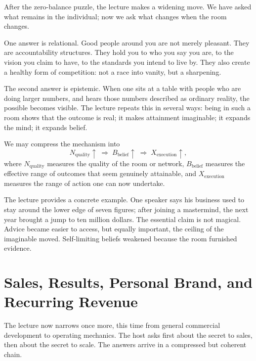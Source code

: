 After the zero-balance puzzle, the lecture makes a widening move. We have asked what remains in the individual; now we ask what changes when the room changes.

One answer is relational. Good people around you are not merely pleasant. They are accountability structures. They hold you to who you say you are, to the vision you claim to have, to the standards you intend to live by. They also create a healthy form of competition: not a race into vanity, but a sharpening.

The second answer is epistemic. When one sits at a table with people who are doing larger numbers, and hears those numbers described as ordinary reality, the possible becomes visible. The lecture repeats this in several ways: being in such a room shows that the outcome is real; it makes attainment imaginable; it expands the mind; it expands belief.

We may compress the mechanism into
\begin{equation}
N_{\mathrm{quality}} \uparrow
\;\Longrightarrow\;
B_{\mathrm{belief}} \uparrow
\;\Longrightarrow\;
X_{\mathrm{execution}} \uparrow,
\end{equation}
where \(N_{\mathrm{quality}}\) measures the quality of the room or network, \(B_{\mathrm{belief}}\) measures the effective range of outcomes that seem genuinely attainable, and \(X_{\mathrm{execution}}\) measures the range of action one can now undertake.

The lecture provides a concrete example. One speaker says his business used to stay around the lower edge of seven figures; after joining a mastermind, the next year brought a jump to ten million dollars. The essential claim is not magical. Advice became easier to access, but equally important, the ceiling of the imaginable moved. Self-limiting beliefs weakened because the room furnished evidence.

\section{Sales, Results, Personal Brand, and Recurring Revenue}

The lecture now narrows once more, this time from general commercial development to operating mechanics. The host asks first about the secret to sales, then about the secret to scale. The answers arrive in a compressed but coherent chain.

